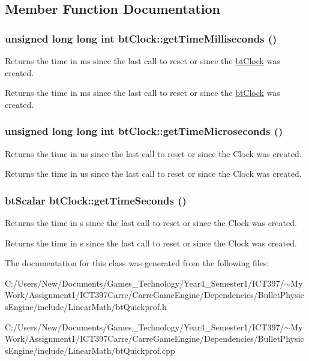 \subsection{Member Function Documentation}
\hypertarget{classbt_clock_989e96af94f4ec3ae28635f5f843c066}{
\subsubsection[getTimeMilliseconds]{\setlength{\rightskip}{0pt plus 5cm}unsigned long long int btClock::getTimeMilliseconds ()}}
\label{classbt_clock_989e96af94f4ec3ae28635f5f843c066}


Returns the time in ms since the last call to reset or since the \hyperlink{classbt_clock}{btClock} was created.

Returns the time in ms since the last call to reset or since the \hyperlink{classbt_clock}{btClock} was created. \hypertarget{classbt_clock_a58b76bfde0b0f3f33d0cb91ec6b6938}{
\subsubsection[getTimeMicroseconds]{\setlength{\rightskip}{0pt plus 5cm}unsigned long long int btClock::getTimeMicroseconds ()}}
\label{classbt_clock_a58b76bfde0b0f3f33d0cb91ec6b6938}


Returns the time in us since the last call to reset or since the Clock was created.

Returns the time in us since the last call to reset or since the Clock was created. \hypertarget{classbt_clock_3fd3c27b67fa12ff3a56a57679667936}{
\subsubsection[getTimeSeconds]{\setlength{\rightskip}{0pt plus 5cm}btScalar btClock::getTimeSeconds ()}}
\label{classbt_clock_3fd3c27b67fa12ff3a56a57679667936}


Returns the time in s since the last call to reset or since the Clock was created.

Returns the time in s since the last call to reset or since the Clock was created. 

The documentation for this class was generated from the following files:\begin{CompactItemize}
\item 
C:/Users/New/Documents/Games\_\-Technology/Year4\_\-Semester1/ICT397/$\sim$My Work/Assignment1/ICT397Carre/CarreGameEngine/Dependencies/BulletPhysicsEngine/include/LinearMath/btQuickprof.h\item 
C:/Users/New/Documents/Games\_\-Technology/Year4\_\-Semester1/ICT397/$\sim$My Work/Assignment1/ICT397Carre/CarreGameEngine/Dependencies/BulletPhysicsEngine/include/LinearMath/btQuickprof.cpp\end{CompactItemize}

